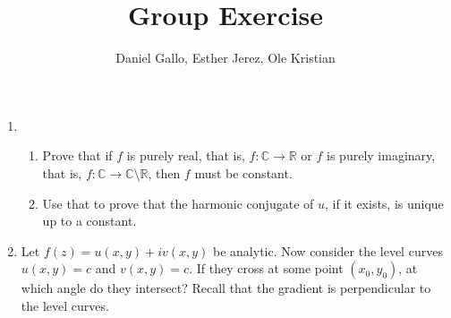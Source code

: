 \documentclass{article}
\title{Group Exercise}
\author{Daniel Gallo, Esther Jerez, Ole Kristian}
\def\C{\mathbb{C}}
\def\R{\mathbb{R}}
\begin{document}
    \maketitle

    \begin{enumerate}
        \item 
            \begin{enumerate}
                \item Prove that if $f$ is purely real, that is, $f \colon \C \to \R$ or $f$ is purely imaginary, that is, $f \colon \C \to \C \setminus \R$, then $f$ must be constant.
                \item Use that to prove that the harmonic conjugate of $u$, if it exists, is unique up to a constant.
            \end{enumerate}
        \item Let $f(z) = u(x, y) + iv(x, y)$ be analytic. Now consider the level curves $u(x, y) = c$ and $v(x, y) = c$. If they cross at some point $(x_0, y_0)$, at which angle do they intersect? Recall that the gradient is perpendicular to the level curves.
    \end{enumerate}
\end{document}

